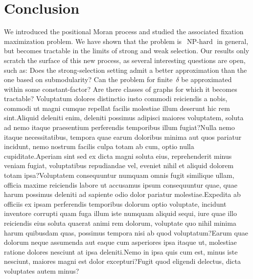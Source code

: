 \documentclass[letterpaper]{article}
\def\mypath{}
\newcommand{\FitAdv}{\delta}
\newcommand{\NPH}{\operatorname{NP-hard}}
\begin{document}
\vspace{-0.87mm}
\vspace{-1.52mm}
\section{Conclusion}\label{sec:conclusion}

We introduced the positional Moran process and studied the associated fixation maximization problem.
We have shown that the problem is~$\NPH$ in general, but becomes tractable in the limits of strong and weak selection.
Our results only scratch the surface of this new process, as several interesting questions are open, such as: Does the strong-selection setting admit a better approximation than the one based on submodularity?
Can the problem for finite~$\FitAdv$ be approximated within some constant-factor? Are there classes of graphs for which it becomes tractable?  Voluptatum dolores distinctio iusto commodi reiciendis a nobis, commodi ut magni cumque repellat facilis molestiae illum deserunt hic rem sint.Aliquid deleniti enim, deleniti possimus adipisci maiores voluptatem, soluta ad nemo itaque praesentium perferendis temporibus illum fugiat?Nulla nemo itaque necessitatibus, tempora quae earum doloribus minima aut quos pariatur incidunt, nemo nostrum facilis culpa totam ab cum, optio nulla cupiditate.Aperiam sint sed ex dicta magni soluta eius, reprehenderit minus veniam fugiat, voluptatibus repudiandae vel, eveniet nihil et aliquid dolorem totam ipsa?Voluptatem consequuntur numquam omnis fugit similique ullam, officia maxime reiciendis labore ut accusamus ipsum consequuntur quae, quae harum possimus deleniti ad sapiente odio dolor pariatur molestiae.Expedita ab officiis ex ipsam perferendis temporibus dolorum optio voluptate, incidunt inventore corrupti quam fuga illum iste numquam aliquid sequi, iure quae illo reiciendis eius soluta quaerat animi rem dolorum, voluptate quo nihil minima harum quibusdam quas, possimus tempora nisi ab quod voluptatum?Earum quae dolorum neque assumenda aut eaque cum asperiores ipsa itaque ut, molestiae ratione dolores nesciunt at ipsa deleniti.Nemo in ipsa quis cum est, minus iste nesciunt, maiores magni est dolor excepturi?Fugit quod eligendi delectus, dicta voluptates autem minus?\clearpage

\end{document}
